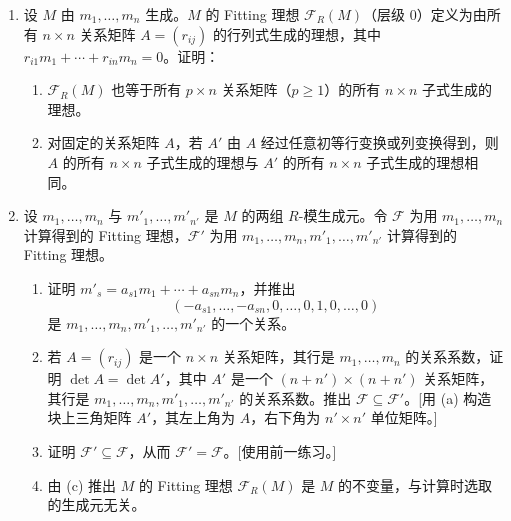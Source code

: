 \begin{enumerate}[label=\arabic*.]
	\item 设 $M$ 由 $m_1,
	\ldots,m_n$ 生成。$M$ 的 Fitting 理想 $\mathcal F_R(M)$（层级 $0$）定义为由所有 $n\times n$ 关系矩阵 $A=(r_{ij})$ 的行列式生成的理想，其中 $r_{i1}m_1+\cdots+r_{in}m_n=0$。证明：
	\begin{enumerate}[label=(\alph*)]
		\item $\mathcal F_R(M)$ 也等于所有 $p\times n$ 关系矩阵（$p\ge1$）的所有 $n\times n$ 子式生成的理想。
		\item 对固定的关系矩阵 $A$，若 $A'$ 由 $A$ 经过任意初等行变换或列变换得到，则 $A$ 的所有 $n\times n$ 子式生成的理想与 $A'$ 的所有 $n\times n$ 子式生成的理想相同。
	\end{enumerate}
	
	\item 设 $m_1,
	\ldots,m_n$ 与 $m'_1,
	\ldots,m'_{n'}$ 是 $M$ 的两组 $R$-模生成元。令 $\mathcal F$ 为用 $m_1,
	\ldots,m_n$ 计算得到的 Fitting 理想，$\mathcal F'$ 为用 $m_1,
	\ldots,m_n,m'_1,
	\ldots,m'_{n'}$ 计算得到的 Fitting 理想。
	\begin{enumerate}[label=(\alph*)]
		\item 证明 $m'_s=a_{s1}m_1+\cdots+a_{sn}m_n$，并推出
		\[
		(-a_{s1},
		\ldots,-a_{sn},0,
		\ldots,0,1,0,
		\ldots,0)
		\]
		是 $m_1,
		\ldots,m_n,m'_1,
		\ldots,m'_{n'}$ 的一个关系。
		\item 若 $A=(r_{ij})$ 是一个 $n\times n$ 关系矩阵，其行是 $m_1,
		\ldots,m_n$ 的关系系数，证明 $\det A=\det A'$，其中 $A'$ 是一个 $(n+n')\times(n+n')$ 关系矩阵，其行是 $m_1,
		\ldots,m_n,m'_1,
		\ldots,m'_{n'}$ 的关系系数。推出 $\mathcal F\subseteq\mathcal F'$。[用 (a) 构造块上三角矩阵 $A'$，其左上角为 $A$，右下角为 $n'\times n'$ 单位矩阵。]
		\item 证明 $\mathcal F'\subseteq\mathcal F$，从而 $\mathcal F'=\mathcal F$。[使用前一练习。]
		\item 由 (c) 推出 $M$ 的 Fitting 理想 $\mathcal F_R(M)$ 是 $M$ 的不变量，与计算时选取的生成元无关。
	\end{enumerate}
	

\end{enumerate}
